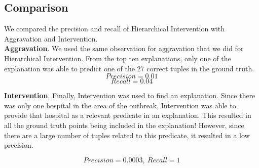 \subsection{Comparison}
We compared the precision and recall of Hierarchical Intervention with Aggravation and Intervention.
\\
\textbf{Aggravation}. We used the same observation for aggravation that we did for Hierarchical Intervention. From the top ten explanations, only one of the explanation was able to predict one of the 27 correct tuples in the ground truth.
$$Precision = 0.01$$
$$Recall = 0.04$$


\textbf{Intervention}. Finally, Intervention was used to find an explanation. Since there was only one hospital in the area of the outbreak, Intervention was able to provide that hospital as a relevant predicate in an explanation. This resulted in all the ground truth points being included in the explanation! However, since there are a large number of tuples related to this predicate, it resulted in a low precision.

$$Precision = 0.0003,\ Recall = 1$$











